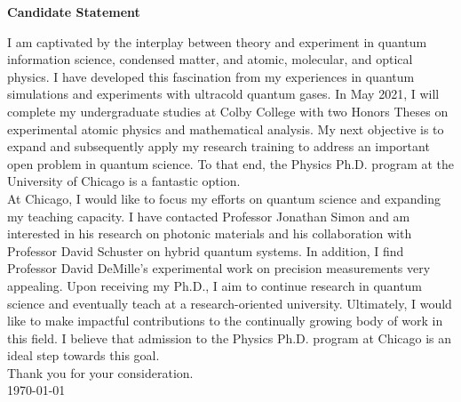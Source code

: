 \documentclass[12pt]{article}
\begin{document}
\begin{center}
	\textbf{Candidate Statement}
\end{center}
I am captivated by the interplay between theory and experiment in quantum information science, condensed matter, and atomic, molecular, and optical physics. I have developed this fascination from my experiences in quantum simulations and experiments with ultracold quantum gases. In May 2021, I will complete my undergraduate studies at Colby College with two Honors Theses on experimental atomic physics and mathematical analysis. My next objective is to expand and subsequently apply my research training to address an important open problem in quantum science. To that end, the Physics Ph.D. program at the University of Chicago is a fantastic option.  \\ 



At Chicago, I would like to focus my efforts on quantum science and expanding my teaching capacity. I have contacted Professor Jonathan Simon and am interested in his research on photonic materials and his collaboration with Professor David Schuster on hybrid quantum systems. In addition, I find Professor David DeMille's experimental work on precision measurements very appealing. Upon receiving my Ph.D., I aim to continue research in quantum science and eventually teach at a research-oriented university. Ultimately, I would like to make impactful contributions to the continually growing body of work in this field. I believe that admission to the Physics Ph.D. program at Chicago is an ideal step towards this goal. \\

\noindent Thank you for your consideration. \\

\noindent \today
	











	
	
	
	
	
\end{document}
